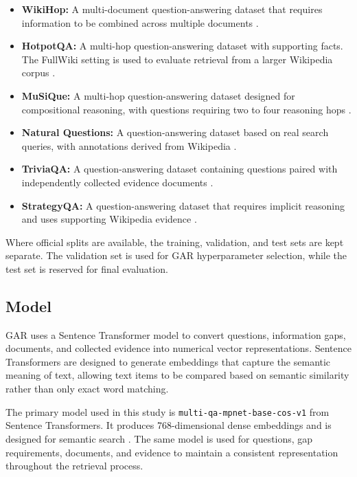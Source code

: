\documentclass[12pt,a4paper]{report}
\begin{document}
\begin{itemize}
    \item \textbf{WikiHop:} A multi-document question-answering dataset that requires information to be combined across multiple documents \cite{welbl2018wikihop}.

    \item \textbf{HotpotQA:} A multi-hop question-answering dataset with supporting facts. The FullWiki setting is used to evaluate retrieval from a larger Wikipedia corpus \cite{yang2018hotpotqa}.

    \item \textbf{MuSiQue:} A multi-hop question-answering dataset designed for compositional reasoning, with questions requiring two to four reasoning hops \cite{trivedi2022musique}.

    \item \textbf{Natural Questions:} A question-answering dataset based on real search queries, with annotations derived from Wikipedia \cite{kwiatkowski2019natural}.

    \item \textbf{TriviaQA:} A question-answering dataset containing questions paired with independently collected evidence documents \cite{joshi2017triviaqa}.

    \item \textbf{StrategyQA:} A question-answering dataset that requires implicit reasoning and uses supporting Wikipedia evidence \cite{geva2021strategyqa}.
\end{itemize}

Where official splits are available, the training, validation, and test sets are kept separate. The validation set is used for GAR hyperparameter selection, while the test set is reserved for final evaluation.

\subsection{Model}

GAR uses a Sentence Transformer model to convert questions, information gaps, documents, and collected evidence into numerical vector representations. Sentence Transformers are designed to generate embeddings that capture the semantic meaning of text, allowing text items to be compared based on semantic similarity rather than only exact word matching.

The primary model used in this study is \texttt{multi-qa-mpnet-base-cos-v1} from Sentence Transformers. It produces 768-dimensional dense embeddings and is designed for semantic search \cite{reimers2019sentence,st2020mpnet}. The same model is used for questions, gap requirements, documents, and evidence to maintain a consistent representation throughout the retrieval process.
\end{document}
